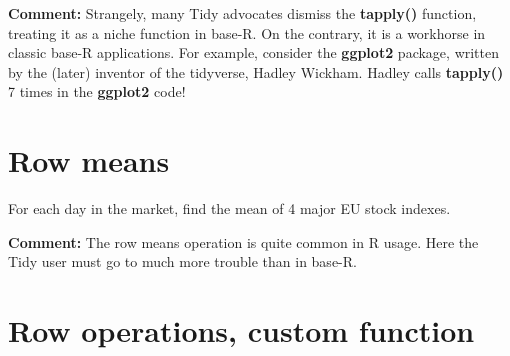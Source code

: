 \documentclass[11pt]{article}
\begin{document}
\textbf{Comment:}  Strangely, many Tidy advocates dismiss the
\textbf{tapply()} function, treating it as a niche function in base-R.
On the contrary, it is a workhorse in classic base-R applications.  For
example, consider the \textbf{ggplot2} package, written by the (later)
inventor of the tidyverse, Hadley Wickham. Hadley calls
\textbf{tapply()} 7 times in the \textbf{ggplot2} code!

\section*{Row means}

For each day in the market, find the mean of 4 major EU stock indexes.

\begin{parcolumns}[rulebetween=true]{2}


\hspace{0.1in}


\end{parcolumns}

\textbf{Comment:} The row means operation is quite common in R usage.
Here the Tidy user must go to much more trouble than in base-R.

\section*{Row operations, custom function}
\end{document}
